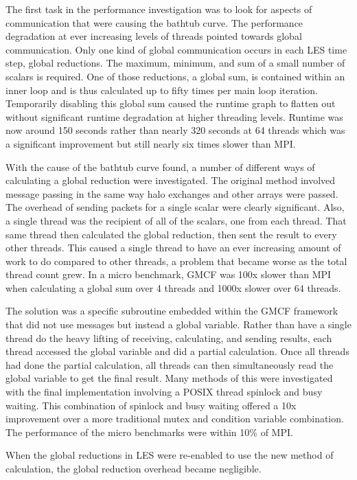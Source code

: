 The first task in the performance investigation was to look for aspects of
communication that were causing the bathtub curve. The performance degradation
at ever increasing levels of threads pointed towards global communication. Only
one kind of global communication occurs in each LES time step, global
reductions. The maximum, minimum, and sum of a small number of scalars is
required. One of those reductions, a global sum, is contained within an inner
loop and is thus calculated up to fifty times per main loop iteration.
Temporarily disabling this global sum caused the runtime graph to flatten out
without significant runtime degradation at higher threading levels. Runtime was
now around 150 seconds rather than nearly 320 seconds at 64 threads which was a
significant improvement but still nearly six times slower than MPI.

With the cause of the bathtub curve found, a number of different ways of
calculating a global reduction were investigated. The original method involved
message passing in the same way halo exchanges and other arrays were passed. The
overhead of sending packets for a single scalar were clearly significant. Also,
a single thread was the recipient of all of the scalars, one from each thread.
That same thread then calculated the global reduction, then sent the result to
every other threads. This caused a single thread to have an ever increasing
amount of work to do compared to other threads, a problem that became worse as
the total thread count grew. In a micro benchmark, GMCF was 100x slower than MPI
when calculating a global sum over 4 threads and 1000x slower over 64 threads.

The solution was a specific subroutine embedded within the GMCF framework that
did not use messages but instead a global variable. Rather than have a single
thread do the heavy lifting of receiving, calculating, and sending results, each
thread accessed the global variable and did a partial calculation. Once all
threads had done the partial calculation, all threads can then simultaneously
read the global variable to get the final result. Many methods of this were
investigated with the final implementation involving a POSIX thread spinlock and
busy waiting. This combination of spinlock and busy waiting offered a 10x
improvement over a more traditional mutex and condition variable combination.
The performance of the micro benchmarks were within 10\% of MPI.

When the global reductions in LES were re-enabled to use the new method of
calculation, the global reduction overhead became negligible.

